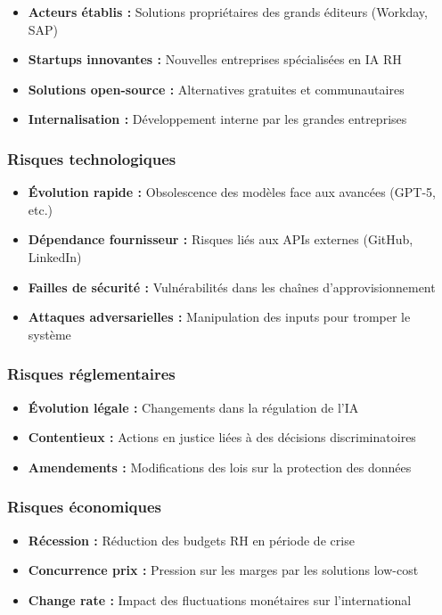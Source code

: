 \documentclass[12pt,a4paper]{report}
\begin{document}
\begin{itemize}
\item \textbf{Acteurs établis :} Solutions propriétaires des grands éditeurs (Workday, SAP)
\item \textbf{Startups innovantes :} Nouvelles entreprises spécialisées en IA RH
\item \textbf{Solutions open-source :} Alternatives gratuites et communautaires
\item \textbf{Internalisation :} Développement interne par les grandes entreprises
\end{itemize}

\subsubsection{Risques technologiques}

\begin{itemize}
\item \textbf{Évolution rapide :} Obsolescence des modèles face aux avancées (GPT-5, etc.)
\item \textbf{Dépendance fournisseur :} Risques liés aux APIs externes (GitHub, LinkedIn)
\item \textbf{Failles de sécurité :} Vulnérabilités dans les chaînes d'approvisionnement
\item \textbf{Attaques adversarielles :} Manipulation des inputs pour tromper le système
\end{itemize}

\subsubsection{Risques réglementaires}

\begin{itemize}
\item \textbf{Évolution légale :} Changements dans la régulation de l'IA
\item \textbf{Contentieux :} Actions en justice liées à des décisions discriminatoires
\item \textbf{Amendements :} Modifications des lois sur la protection des données
\end{itemize}

\subsubsection{Risques économiques}

\begin{itemize}
\item \textbf{Récession :} Réduction des budgets RH en période de crise
\item \textbf{Concurrence prix :} Pression sur les marges par les solutions low-cost
\item \textbf{Change rate :} Impact des fluctuations monétaires sur l'international
\end{itemize}
\end{document}
